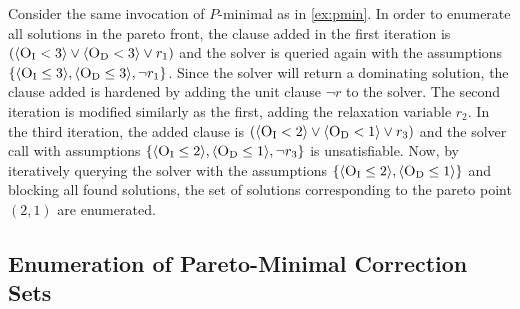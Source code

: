 \begin{example}
  Consider the same invocation of $P$-minimal as in \cref{ex:pmin}.
  In order to enumerate all solutions in the pareto front, the clause added in the first iteration is $(\langle \textsc{O}_{\text{I}} < 3 \rangle \lor \langle \textsc{O}_{\text{D}} < 3 \rangle \lor r_1)$ and the solver is queried again with the assumptions $\{ \langle \textsc{O}_{\text{I}} \leq 3 \rangle, \langle \textsc{O}_{\text{D}} \leq 3 \rangle, \lnot r_1 \}$.
  Since the solver will return a dominating solution, the clause added is hardened by adding the unit clause $\lnot r$ to the solver.
  The second iteration is modified similarly as the first, adding the relaxation variable $r_2$.
  In the third iteration, the added clause is $(\langle \textsc{O}_{\text{I}} < 2 \rangle \lor \langle \textsc{O}_{\text{D}} < 1 \rangle \lor r_3)$ and the solver call with assumptions $\{ \langle \textsc{O}_{\text{I}} \leq 2 \rangle, \langle \textsc{O}_{\text{D}} \leq 1 \rangle, \lnot r_3 \}$ is unsatisfiable.
  Now, by iteratively querying the solver with the assumptions $\{ \langle \textsc{O}_{\text{I}} \leq 2 \rangle, \langle \textsc{O}_{\text{D}} \leq 1 \rangle \}$ and blocking all found solutions, the set of solutions corresponding to the pareto point $(2,1)$ are enumerated.
\end{example}

\subsection{Enumeration of Pareto-Minimal Correction Sets\label{sec:pareto-mcs}}

